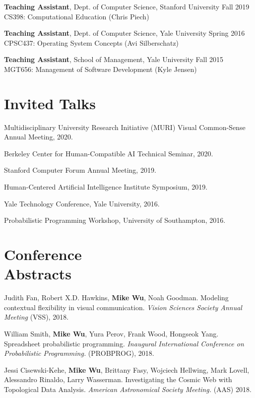 \documentclass[margin, 10pt]{res} %
\begin{document}
\begin{resume}
\textbf{Teaching Assistant}, Dept. of Computer Science, Stanford University \hfill Fall 2019\\
CS398: Computational Education (Chris Piech)

\textbf{Teaching Assistant}, Dept. of Computer Science, Yale University \hfill Spring 2016\\
CPSC437: Operating System Concepts (Avi Silberschatz)

\textbf{Teaching Assistant}, School of Management, Yale University \hfill Fall 2015\\
MGT656: Management of Software Development (Kyle Jensen)


\section{Invited Talks}

Multidisciplinary University Research Initiative (MURI) Visual Common-Sense Annual Meeting, 2020.

Berkeley Center for Human-Compatible AI Technical Seminar, 2020.

Stanford Computer Forum Annual Meeting, 2019.

Human-Centered Artificial Intelligence Institute Symposium, 2019.

Yale Technology Conference, Yale University, 2016.

Probabilistic Programming Workshop, University of Southampton, 2016.

\section{Conference \\ Abstracts}

Judith Fan, Robert X.D. Hawkins, \textbf{Mike Wu}, Noah Goodman. Modeling contextual flexibility in visual communication. \textit{Vision Sciences Society Annual Meeting} (VSS), 2018.

William Smith, \textbf{Mike Wu}, Yura Perov, Frank Wood, Hongseok Yang. Spreadsheet probabilistic programming. \textit{Inaugural International Conference on Probabilistic Programming.} (PROBPROG), 2018.

Jessi Cisewski-Kehe, \textbf{Mike Wu}, Brittany Fasy, Wojciech Hellwing, Mark Lovell, Alessandro Rinaldo, Larry Wasserman. Investigating the Cosmic Web with Topological Data Analysis. \textit{American Astronomical Society Meeting.} (AAS) 2018.


\end{resume}
\end{document}
